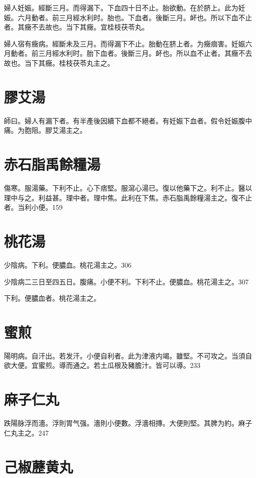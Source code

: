 婦人妊娠。經斷三月。而得漏下。下血四十日不止。胎欲動。在於脐上。此为妊娠。六月動者。前三月經水利时。胎也。下血者。後斷三月。衃也。所以下血不止者。其癥不去故也。当下其癥。宜桂枝茯苓丸。{\wuben}

婦人宿有癥病。經斷未及三月。而得漏下不止。胎動在脐上者。为癥痼害。妊娠六月動者。前三月經水利时。胎下血者。後斷三月。衃也。所以血不止者。其癥不去故也。当下其癥。桂枝茯苓丸主之。{\dengben}

\section{膠艾湯}

師曰。婦人有漏下者。有半產後因續下血都不絕者。有妊娠下血者。假令妊娠腹中痛。为胞阻。膠艾湯主之。

\section{赤石脂禹餘糧湯}

傷寒。服湯藥。下利不止。心下痞堅。服瀉心湯已。復以他藥下之。利不止。醫以理中与之。利益甚。理中者。理中焦。此利在下焦。赤石脂禹餘糧湯主之。復不止者。当利小便。159

\section{桃花湯}

少陰病。下利。便膿血。桃花湯主之。306

少陰病二三日至四五日。腹痛。小便不利。下利不止。便膿血。桃花湯主之。307

下利。便膿血者。桃花湯主之。

\section{蜜煎}

陽明病。自汗出。若发汗。小便自利者。此为{\khaaitp 津液}内竭。雖堅。不可攻之。当須自欲大便。宜蜜煎。導而通之。若土瓜根及豬膽汁。皆可以導。233

\section{麻子仁丸}

跌陽脉浮而濇。浮則胃气强。濇則小便數。浮濇相摶。大便則堅。其脾为約。麻子仁丸主之。247

\section{己椒藶黄丸}

